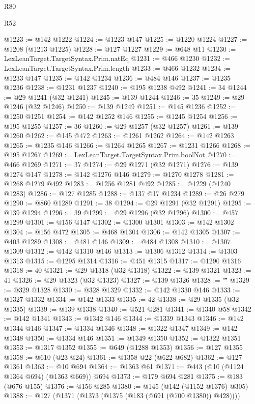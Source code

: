\begin{lexlean}{R80}
\begin{lexlean}{R52}
\begin{coremodule}
{{{{{{{{{{{{{{{{{{{{{{{{{{{{{{{{{{{{{{{{{{{{{{{{{{{{{{{{{{{{{{{{{{{{{{{{{{{{{{{{{{{{{{{{{{{{{{{{{{{{{{{{{{{{{{{{{{{{{{{{{{{{{{{{{{{{{{{{{{{{{{{{{{{{{{{{{{{{{{{{{{{{{{{{{{{{{{{{{{{{{{{{{{{{{{{{{{{{{{@1223 := @142 @1222
@1224 := @1223 @147
@1225 := @1220 @1224
@1227 := @1208 (@1213 @1225)
@1228 := @127 @1227
@1229 := @648 @11
@1230 := LexLeanTarget.TargetSyntax.Prim.natEq
@1231 := @466 @1230
@1232 := LexLeanTarget.TargetSyntax.Prim.length
@1233 := @466 @1232
@1234 := @1233 @147
@1235 := @142 @1234
@1236 := @484 @146
@1237 := @1235 @1236
@1238 := @1231 @1237
@1240 := @195 @1238 @492
@1241 := 34
@1244 := @29 @1241 (@32 @1241)
@1245 := @139 @1244
@1246 := 35
@1249 := @29 @1246 (@32 @1246)
@1250 := @139 @1249
@1251 := @145 @1236
@1252 := @1250 @1251
@1254 := @142 @1252 @146
@1255 := @1245 @1254
@1256 := @195 @1255
@1257 := 36
@1260 := @29 @1257 (@32 @1257)
@1261 := @139 @1260
@1262 := @145 @472
@1263 := @1261 @1262
@1264 := @142 @1263
@1265 := @1235 @146
@1266 := @1264 @1265
@1267 := @1231 @1266
@1268 := @195 @1267
@1269 := LexLeanTarget.TargetSyntax.Prim.boolNot
@1270 := @466 @1269
@1271 := 37
@1274 := @29 @1271 (@32 @1271)
@1276 := @139 @1274 @147
@1278 := @142 @1276 @146
@1279 := @1270 @1278
@1281 := @1268 @1279 @492
@1283 := @1256 @1281 @492
@1285 := @1229 (@1240 @1283)
@1286 := @127 @1285
@1288 := @137 @17 @1234
@1289 := @26 @279
@1290 := @860 @1289
@1291 := 38
@1294 := @29 @1291 (@32 @1291)
@1295 := @139 @1294
@1296 := 39
@1299 := @29 @1296 (@32 @1296)
@1300 := @457 @1299
@1301 := @156 @147
@1302 := @1300 @1301
@1303 := @142 @1302
@1304 := @156 @472
@1305 := @468 @1304
@1306 := @142 @1305
@1307 := @403 @1289
@1308 := @481 @146
@1309 := @484 @1308
@1310 := @1307 @1309
@1312 := @142 @1310 @146
@1313 := @1306 @1312
@1314 := @1303 @1313
@1315 := @1295 @1314
@1316 := @451 @1315
@1317 := @1290 @1316
@1318 := 40
@1321 := @29 @1318 (@32 @1318)
@1322 := @139 @1321
@1323 := 41
@1326 := @29 @1323 (@32 @1323)
@1327 := @139 @1326
@1328 := "\""
@1329 := @329 @1328
@1330 := @328 @1329
@1332 := @142 @1330 @146
@1333 := @1327 @1332
@1334 := @142 @1333
@1335 := 42
@1338 := @29 @1335 (@32 @1335)
@1339 := @139 @1338
@1340 := @521 @281
@1341 := @1340 @58
@1342 := @142 @1341
@1343 := @1342 @146
@1344 := @1339 @1343
@1346 := @142 @1344 @146
@1347 := @1334 @1346
@1348 := @1322 @1347
@1349 := @142 @1348
@1350 := @1334 @146
@1351 := @1349 @1350
@1352 := @1322 @1351
@1353 := @1317 @1352
@1355 := @649 (@1288 @1353)
@1356 := @127 @1355
@1358 := @610 (@23 @24)
@1361 := @1358 @22 (@622 @682)
@1362 := @127 @1361
@1363 := @10 @694
@1364 := @1363 @61
@1371 := @443 (@10 (@1124 @1364 @694) (@1363 @669)) @694
@1373 := @179 @694 @281
@1375 := @183 (@676 @155)
@1376 := @156 @285
@1380 := @145 (@142 (@1152 @1376) @305)
@1388 := @127 (@1371 (@1373 (@1375 (@183 (@691 (@700 @1380)) @428))))
}}}}}}}}}}}}}}}}}}}}}}}}}}}}}}}}}}}}}}}}}}}}}}}}}}}}}}}}}}}}}}}}}}}}}}}}}}}}}}}}}}}}}}}}}}}}}}}}}}}}}}}}}}}}}}}}}}}}}}}}}}}}}}}}}}}}}}}}}}}}}}}}}}}}}}}}}}}}}}}}}}}}}}}}}}}}}}}}}}}}}}}}}}}}}}}}}}}}}}
\end{coremodule}
\end{lexlean}
\end{lexlean}
